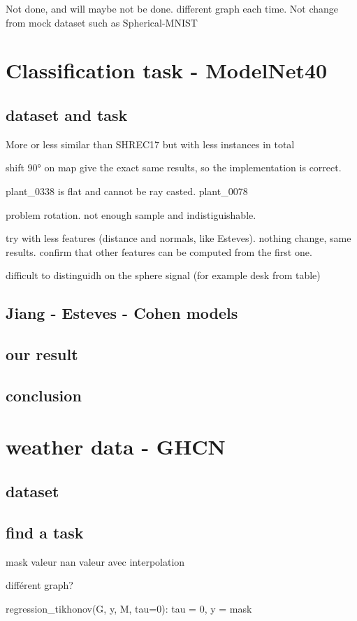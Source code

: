 \documentclass[11pt]{report}
\begin{document}
Not done, and will maybe not be done. different graph each time. Not change from mock dataset such as Spherical-MNIST
\section{Classification task - ModelNet40}
\subsection{dataset and task}
More or less similar than SHREC17 but with less instances in total

shift 90° on map give the exact same results, so the implementation is correct.

plant\_0338 is flat and cannot be ray casted.
plant\_0078

problem rotation. not enough sample and indistiguishable.

try with less features (distance and normals, like Esteves). nothing change, same results. confirm that other features can be computed from the first one.

difficult to distinguidh on the sphere signal (for example desk from table)
\subsection{Jiang - Esteves - Cohen models}

\subsection{our result}

\subsection{conclusion}
\section{weather data - GHCN}
\subsection{dataset}
\subsection{find a task}
mask valeur nan
valeur avec interpolation

différent graph?

regression\_tikhonov(G, y, M, tau=0): tau = 0, y = mask
\end{document}

